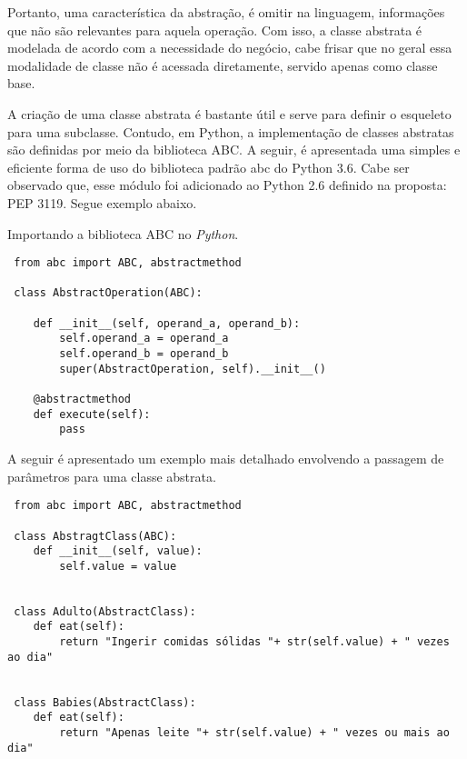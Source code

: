 \documentclass[11pt,a4paper]{article}
\begin{document}
\vspace{0.1in}

Portanto, uma característica da abstração, é omitir na linguagem, informações que não são relevantes para aquela operação. Com isso, a classe abstrata é modelada de acordo com a necessidade do negócio, cabe frisar que no geral essa modalidade de classe não é acessada diretamente, servido apenas como classe base.

\vspace{0.1in}

A criação de uma classe abstrata é bastante útil e serve para definir o esqueleto para uma subclasse. Contudo, em Python, a implementação de classes abstratas são definidas por meio da biblioteca ABC. A seguir, é apresentada uma simples e eficiente forma de uso do biblioteca padrão abc do Python 3.6. Cabe ser observado que, esse módulo foi adicionado ao Python 2.6 definido na proposta: PEP 3119. Segue exemplo abaixo.

% 
\vspace{0.3in}
\vspace{0.3in}
\vspace{0.3in}
Importando a biblioteca ABC no \textit{Python}. 
\begin{lstlisting}
 from abc import ABC, abstractmethod 
 
 class AbstractOperation(ABC):
 
	def __init__(self, operand_a, operand_b):
		self.operand_a = operand_a
		self.operand_b = operand_b
		super(AbstractOperation, self).__init__()
    
	@abstractmethod
	def execute(self):
		pass
	\end{lstlisting}
	
\vspace{0.3in}

A seguir é apresentado um exemplo mais detalhado envolvendo a passagem de parâmetros para uma classe abstrata.  

\vspace{0.2in}

 \begin{lstlisting}
 from abc import ABC, abstractmethod
     
 class AbstragtClass(ABC): 
	def __init__(self, value):
		self.value = value
         
         
 class Adulto(AbstractClass):         
	def eat(self):
		return "Ingerir comidas sólidas "+ str(self.value) + " vezes ao dia"
 
 
 class Babies(AbstractClass):         
	def eat(self):
		return "Apenas leite "+ str(self.value) + " vezes ou mais ao dia"
 
 \end{lstlisting}
\end{document}
